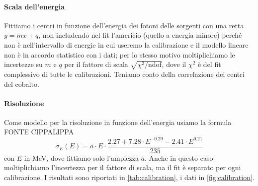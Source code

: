 \paragraph{Scala dell'energia}

Fittiamo i centri in funzione dell'energia dei fotoni delle sorgenti con una retta $y=mx+q$,
non includendo nel fit l'americio (quello a energia minore)
perché non è nell'intervallo di energie in cui useremo la calibrazione
e il modello lineare non è in accordo statistico con i dati;
per lo stesso motivo moltiplichiamo le incertezze su $m$ e $q$ per il fattore di scala $\sqrt{\chi^2/\mathrm{ndof}}$,
dove il $\chi^2$ è del fit complessivo di tutte le calibrazioni.
Teniamo conto della correlazione dei centri del cobalto.

\paragraph{Risoluzione}

Come modello per la risoluzione in funzione dell'energia usiamo la formula
FONTE CIPPALIPPA
\begin{equation}
	\sigma_E(E) = a \cdot E \cdot \frac{2.27 + 7.28 \cdot E ^ {-0.29} - 2.41 \cdot E ^ {0.21}} {235}
\end{equation}
con $E$ in \si{MeV}, dove fittiamo solo l'ampiezza $a$.
Anche in questo caso moltiplichiamo l'incertezza per il fattore di scala,
ma il fit è separato per ogni calibrazione.
I risultati sono riportati in \autoref{tab:calibration},
i dati in \autoref{fig:calibration}.
